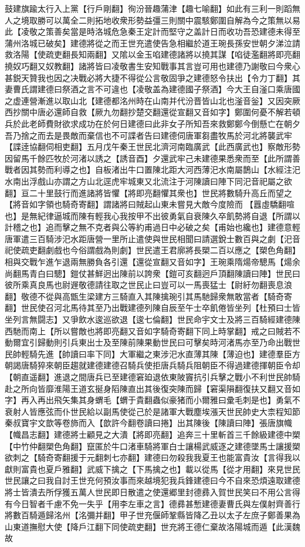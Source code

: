 鼓建旗踰太行入上黨【行戶剛翻】徇汾晉趣蒲津【趣七喻翻】如此有三利一則蹈無人之境取勝可以萬全二則拓地收衆形勢益彊三則關中震駭鄭圍自解為今之策無以易此【凌敬之策善矣當是時洛城危急秦王定計而堅守之盖計日而收功吾恐建德未得至蒲州洛城已破矣】建德將從之而王世充遣使告急相繼於道王琬長孫安世朝夕涕泣請救洛陽【使疏吏翻長知兩翻】又隂以金玉啗建德諸將以撓其謀【啗徒濫翻將即亮翻撓奴巧翻又奴教翻】諸將皆曰凌敬書生安知戰事其言豈可用也建德乃謝敬曰今衆心甚鋭天贊我也因之决戰必將大捷不得從公言敬固爭之建德怒令扶出【令力丁翻】其妻曹氏謂建德曰祭酒之言不可違也【凌敬盖為建德國子祭酒】今大王自滏口乘唐國之虚連營漸進以取山北【建德都洺州時在山南并代汾晋皆山北也滏音釡】又因突厥西抄關中唐必還師自救【厥九勿翻抄楚交翻還從宣翻又音如字】鄭圍何憂不解若頓兵於此老師費財欲求成功在於何日建德曰此非女子所知吾來救鄭鄭今倒懸亡在朝夕吾乃捨之而去是畏敵而棄信也不可諜者告曰建德伺唐軍芻盡牧馬於河北將襲武牢【諜逹協翻伺相吏翻】五月戊午秦王世民北濟河南臨廣武【此西廣武也】察敵形勢因留馬千餘匹牧於河渚以誘之【誘音酉】夕還武牢己未建德果悉衆而至【此所謂善戰者因其勢而利導之也】自板渚出牛口置陳北距大河西薄汜水南屬鵲山【水經注汜水南出浮戲山亦謂之方山北逕虎牢城東又北流注于河陳讀曰陣下同汜音祀屬之欲翻】亘二十里鼓行而進諸將皆懼【將即亮翻懼其衆也】世民將數騎升高丘而望之【將音如字領也騎奇寄翻】謂諸將曰賊起山東未嘗見大敵今度險而【囂虛驕翻喧也】是無紀律逼城而陳有輕我心我按甲不出彼勇氣自衰陳久卒飢勢將自退【所謂以計稽之也】追而擊之無不克者與公等約甫過日中必破之矣【甫始也纔也】建德意輕唐軍遣三百騎涉汜水距唐營一里所止遣使與世民相聞曰請選銳士數百與之劇【汜音祀使疏吏翻劇戲也今俗謂戲為則劇】世民遣王君廓將長槊二百以應之【槊色角翻】相與交戰乍進乍退兩無勝負各引還【還從宣翻又音如字】王琬乘隋煬帝驄馬【煬余尚翻馬青白曰驄】鎧仗甚鮮迥出陳前以誇衆【鎧可亥翻迥戶頂翻陳讀曰陣】世民曰彼所乘真良馬也尉遟敬德請往取之世民止曰豈可以一馬喪猛士【尉紆勿翻喪息浪翻】敬德不從與高甑生梁建方三騎直入其陳擒琬引其馬馳歸衆無敢當者【騎奇寄翻】世民使召河北馬待其至乃出戰建德列陳自辰至午士卒飢倦皆坐列【杜預曰士皆坐列言無闘志】又爭飲水逡巡欲退【逡七倫翻】世民命宇文士及將三百騎經建德陳西馳而南上【所以嘗敵也將即亮翻又音如字騎奇寄翻下同上時掌翻】戒之曰賊若不動爾宜引歸動則引兵東出士及至陳前陳果動世民曰可擊矣時河渚馬亦至乃命出戰世民帥輕騎先進【帥讀曰率下同】大軍繼之東涉汜水直薄其陳【薄迫也】建德羣臣方朝謁唐騎猝來朝臣趨就建德建德召騎兵使拒唐兵騎兵阻朝臣不得過建德揮朝臣令却【朝直遥翻】進退之間唐兵已至建德窘廹退依東陂竇抗引兵擊之戰小不利世民帥騎赴之所向皆靡淮陽王道玄挻身䧟陳直出其後復突陳而歸【窘渠隕翻復扶又翻又音如字】再入再出飛矢集其身蝟毛【蝟于貴翻蟲似豪猪而小爾雅曰彚毛刺是也】勇氣不衰射人皆應弦而仆世民給以副馬使從己於是諸軍大戰塵埃漲天世民帥史大柰程知節秦叔寶宇文歆等卷斾而入【歆許今翻卷讀曰捲】出其陳後【陳讀曰陣】張唐旗幟【幟昌志翻】建德將士顧見之大潰【將即亮翻】追奔三十里斬首三千餘級建德中槊【中竹仲翻槊色角翻】竄匿於牛口渚車騎將軍白士讓楊武威逐之建德墜馬士讓援槊欲刺之【騎奇寄翻援于元翻刺七亦翻】建德曰勿殺我我夏王也能富貴汝【言得我以獻則富貴也夏戶雅翻】武威下擒之【下馬擒之也】載以從馬【從才用翻】來見世民世民讓之曰我自討王世充何預汝事而來越境犯我兵鋒建德曰今不自來恐煩遠取建德將士皆潰去所俘獲五萬人世民即日散遣之使還郷里封德彞入賀世民笑曰不用公言得有今日智者千慮不免一失乎【用李左車之言】德彞甚慙建德妻曹氏與左僕射齊善行將數百騎遁歸洺州【洺彌并翻】甲子世充偃師鞏縣皆降乙丑以太子左庶子鄭善果為山東道撫慰大使【降戶江翻下同使疏吏翻】世充將王德仁棄故洛陽城而遁【此漢魏故